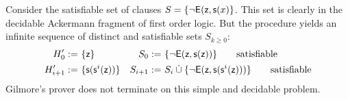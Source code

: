 \begin{example}\label{ex:sat:exy}
	Consider the satisfiable set of clauses
	\( S = \{ \lnot\mathsf{E}(\mathsf{z},\mathsf{s}(x)\} \).
	This set is clearly in the decidable Ackermann fragment of first order logic.
	But the procedure yields an infinite sequence of distinct and satisfiable sets \( S_{k\geq0} \):
	\begin{align*}
	H'_{0} :=&{\ } \{ \mathsf{z} \}
	&
	S_{0} :=&{\ } \{ \lnot\mathsf{E}(\mathsf{z},\mathsf{s}(\mathsf{z}))
	\}
	\tag*{satisfiable}
	\\
	H'_{i+1} :=&{\ } \{ \mathsf{s}(\mathsf{s}^{i}(\mathsf{z})) \}
	&
	S_{i+1} :=&{\ }S_i \mathbin{\dot\cup}
	 \{
	\lnot\mathsf{E}(\mathsf{z},\mathsf{s}(\mathsf{s}^i(\mathsf{z})))
	\}
	\tag*{satisfiable}
	\end{align*}
	Gilmore's prover does not terminate on this simple and decidable problem.
\end{example}




